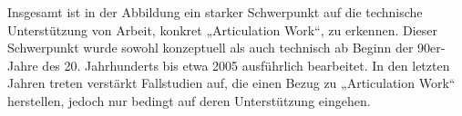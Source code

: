 Insgesamt ist in der Abbildung ein starker Schwerpunkt auf die technische Unterstützung von Arbeit, konkret „Articulation Work“, zu erkennen. Dieser Schwerpunkt wurde sowohl konzeptuell als auch technisch ab Beginn der 90er-Jahre des 20. Jahrhunderts bis etwa 2005 ausführlich bearbeitet. In den letzten Jahren treten verstärkt Fallstudien auf, die einen Bezug zu „Articulation Work“ herstellen, jedoch nur bedingt auf deren Unterstützung eingehen.



